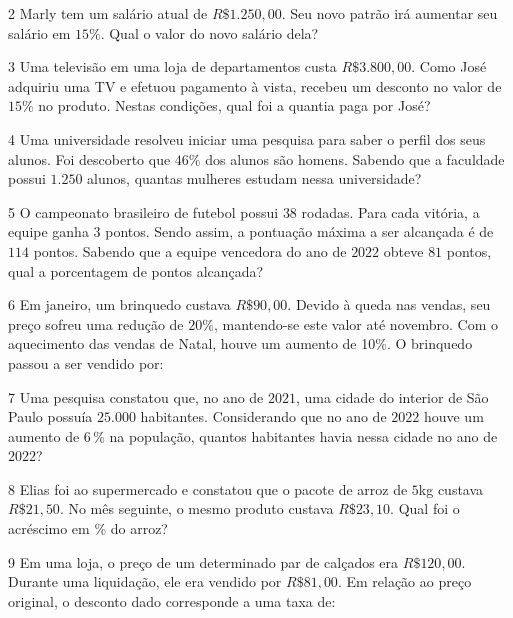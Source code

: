 \num{2}  Marly tem um salário atual de $R\$1.250,00$. Seu novo patrão irá
aumentar seu salário em $15\%$. Qual o valor do novo salário dela?


\num{3}  Uma televisão em uma loja de departamentos custa $R\$3.800,00$. Como José adquiriu uma TV e efetuou pagamento à vista, recebeu um
desconto no valor de $15\%$ no produto. Nestas condições, qual foi a
quantia paga por José?


\num{4}  Uma universidade resolveu iniciar uma pesquisa para saber o perfil
dos seus alunos. Foi descoberto que $46\%$ dos alunos são homens. Sabendo
que a faculdade possui $1.250$ alunos, quantas mulheres estudam nessa
universidade?


\num{5}  O campeonato brasileiro de futebol possui $38$ rodadas. Para cada
vitória, a equipe ganha $3$ pontos. Sendo assim, a pontuação máxima a ser
alcançada é de $114$ pontos. Sabendo que a equipe vencedora do ano de $2022$
obteve $81$ pontos, qual a porcentagem de pontos alcançada?


\num{6}  Em janeiro, um brinquedo custava $R\$90,00$. Devido à queda nas
vendas, seu preço sofreu uma redução de $20\%$, mantendo-se este valor até
novembro. Com o aquecimento das vendas de Natal, houve um aumento de
10\%. O brinquedo passou a ser vendido por:


\num{7}  Uma pesquisa constatou que, no ano de $2021$, uma cidade do interior de
São Paulo possuía $25.000$ habitantes. Considerando que no ano de $2022$
houve um aumento de $6\,\%$ na população, quantos habitantes havia nessa
cidade no ano de $2022$?


\num{8}  Elias foi ao supermercado e constatou que o pacote de arroz de $5$kg
custava $R\$21,50$. No mês seguinte, o mesmo produto custava $R\$23,10$.
Qual foi o acréscimo em \% do arroz?


\num{9}  Em uma loja, o preço de um determinado par de calçados era
$R\$120,00$. Durante uma liquidação, ele era vendido por $R\$81,00$. Em
relação ao preço original, o desconto dado corresponde a uma taxa de:

